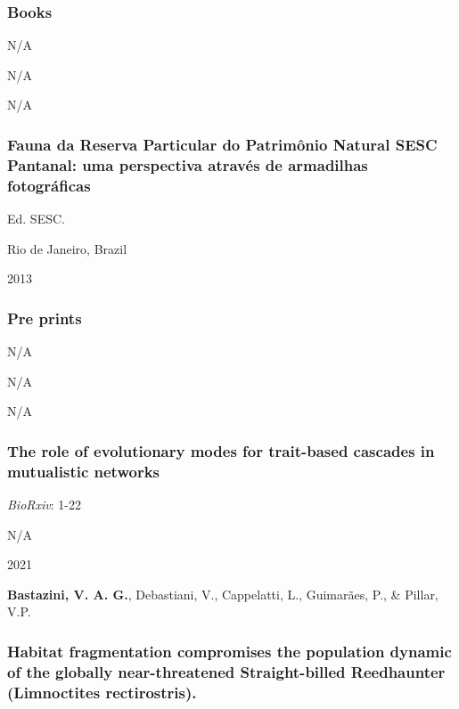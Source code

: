 \documentclass[
]{article}
\begin{document}
\hypertarget{books}{%
\subsubsection{Books}\label{books}}

N/A

N/A

N/A

\hypertarget{fauna-da-reserva-particular-do-patrimuxf4nio-natural-sesc-pantanal-uma-perspectiva-atravuxe9s-de-armadilhas-fotogruxe1ficas}{%
\subsubsection{Fauna da Reserva Particular do Patrimônio Natural SESC
Pantanal: uma perspectiva através de armadilhas
fotográficas}\label{fauna-da-reserva-particular-do-patrimuxf4nio-natural-sesc-pantanal-uma-perspectiva-atravuxe9s-de-armadilhas-fotogruxe1ficas}}

Ed. SESC.

Rio de Janeiro, Brazil

2013

\hypertarget{pre-prints}{%
\subsubsection{Pre prints}\label{pre-prints}}

N/A

N/A

N/A

\hypertarget{the-role-of-evolutionary-modes-for-trait-based-cascades-in-mutualistic-networks}{%
\subsubsection{The role of evolutionary modes for trait-based cascades
in mutualistic
networks}\label{the-role-of-evolutionary-modes-for-trait-based-cascades-in-mutualistic-networks}}

\emph{BioRxiv}: 1-22

N/A

2021

\textbf{Bastazini, V. A. G.}, Debastiani, V., Cappelatti, L., Guimarães,
P., \& Pillar, V.P.

\hypertarget{habitat-fragmentation-compromises-the-population-dynamic-of-the-globally-near-threatened-straight-billed-reedhaunter-limnoctites-rectirostris.}{%
\subsubsection{Habitat fragmentation compromises the population dynamic
of the globally near-threatened Straight-billed Reedhaunter (Limnoctites
rectirostris).}\label{habitat-fragmentation-compromises-the-population-dynamic-of-the-globally-near-threatened-straight-billed-reedhaunter-limnoctites-rectirostris.}}
\end{document}
